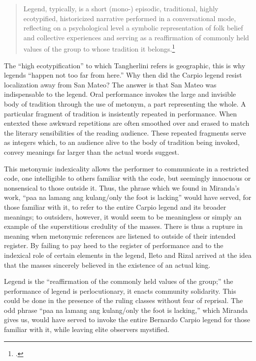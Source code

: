 \begin{quote}
Legend, typically, is a short (mono-) episodic, traditional, highly ecotypified, historicized narrative performed in a conversational mode, reflecting on a psychological level a symbolic representation of folk belief and collective experiences and serving as a reaffirmation of commonly held values of the group to whose tradition it belongs.\footcite[385]{Tangherlini1990}
\end{quote}

The \enquote{high ecotypification} to which Tangherlini refers is geographic, this is why legends \enquote{happen not too far from here.} Why then did the Carpio legend resist localization away from San Mateo? The answer is that San Mateo was indispensable to the legend. Oral performance invokes the large and invisible body of tradition through the use of metonym, a part representing the whole. A particular fragment of tradition is insistently repeated in performance. When entexted these awkward repetitions are often smoothed over and erased to match the literary sensibilities of the reading audience. These repeated fragments serve as integers which, to an audience alive to the body of tradition being invoked, convey meanings far larger than the actual words suggest.

This metonymic indexicality allows the performer to communicate in a restricted code, one intelligible to others familiar with the code, but seemingly innocuous or nonsensical to those outside it. Thus, the phrase which we found in Miranda's work, \enquote{paa na lamang ang kulang/only the foot is lacking} would have served, for those familiar with it, to refer to the entire Carpio legend and its broader meanings; to outsiders, however, it would seem to be meaningless or simply an example of the superstitious credulity of the masses. There is thus a rupture in meaning when metonymic references are listened to outside of their intended register. By failing to pay heed to the register of performance and to the indexical role of certain elements in the legend, Ileto and Rizal arrived at the idea that the masses sincerely believed in the existence of an actual king.

Legend is the \enquote{reaffirmation of the commonly held values of the group;} the performance of legend is perlocutionary, it enacts community solidarity. This could be done in the presence of the ruling classes without fear of reprisal. The odd phrase \enquote{paa na lamang ang kulang/only the foot is lacking,} which Miranda gives us, would have served to invoke the entire Bernardo Carpio legend for those familiar with it, while leaving elite observers mystified.

